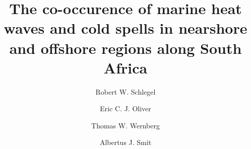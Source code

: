 \documentclass[a4paper,10pt,review]{elsarticle}
\begin{document}
\begin{frontmatter}

\title{The co-occurence of marine heat waves and cold spells in nearshore and offshore regions along South Africa}

\author[firstaddress]{Robert W. Schlegel}

\author[secondaddress,thirdaddress]{Eric C. J. Oliver}
\author[fourthaddress]{Thomas W. Wernberg}
\author[firstaddress]{Albertus J. Smit}


\address[firstaddress]{Department for Biodiversity and Conservation Biology, University of the Western Cape, Private Bag X17, Bellville 7535, South Africa}

\address[secondaddress]{ARC Centre of Excellence for Climate System Science, The University of New South Wales, Sydney, Australia}

\address[thirdaddress]{Institute for Marine and Antarctic Studies, University of Tasmania, Hobart, Australia}

\address[fourthaddress]{UWA Oceans Institute and School of Plant Biology, The University of Western Australia, Crawley, 6009 Western Australia, Australia}


\end{frontmatter}
\end{document}
